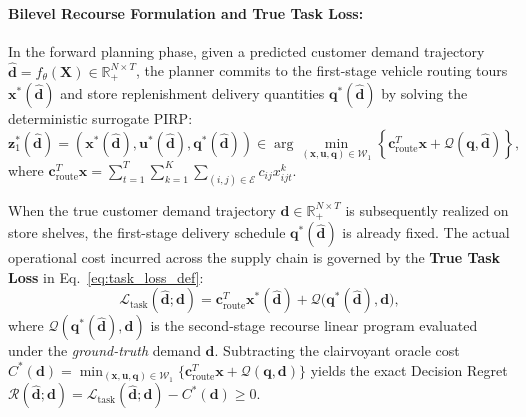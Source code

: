 \documentclass[11pt,a4paper]{article}
\theoremstyle{definition}
\theoremstyle{remark}
\begin{document}
\paragraph{Bilevel Recourse Formulation and True Task Loss:}
In the forward planning phase, given a predicted customer demand trajectory $\hat{\mathbf{d}} = f_\theta(\mathbf{X}) \in \mathbb{R}_+^{N \times T}$, the planner commits to the first-stage vehicle routing tours $\mathbf{x}^*(\hat{\mathbf{d}})$ and store replenishment delivery quantities $\mathbf{q}^*(\hat{\mathbf{d}})$ by solving the deterministic surrogate PIRP:
\begin{equation}
    \mathbf{z}_1^*(\hat{\mathbf{d}}) = (\mathbf{x}^*(\hat{\mathbf{d}}), \mathbf{u}^*(\hat{\mathbf{d}}), \mathbf{q}^*(\hat{\mathbf{d}})) \in \arg\min_{(\mathbf{x}, \mathbf{u}, \mathbf{q}) \in \mathcal{W}_1} \left\{ \mathbf{c}_{\text{route}}^T \mathbf{x} + \mathcal{Q}(\mathbf{q}, \hat{\mathbf{d}}) \right\}, \label{eq:forward_surrogate_pirp}
\end{equation}
where $\mathbf{c}_{\text{route}}^T \mathbf{x} = \sum_{t=1}^T \sum_{k=1}^K \sum_{(i,j) \in \mathcal{E}} c_{ij} x_{ijt}^k$.

When the true customer demand trajectory $\mathbf{d} \in \mathbb{R}_+^{N \times T}$ is subsequently realized on store shelves, the first-stage delivery schedule $\mathbf{q}^*(\hat{\mathbf{d}})$ is already fixed. The actual operational cost incurred across the supply chain is governed by the \textbf{True Task Loss} in Eq.~\eqref{eq:task_loss_def}:
\begin{equation}
    \mathcal{L}_{\text{task}}(\hat{\mathbf{d}}; \mathbf{d}) = \mathbf{c}_{\text{route}}^T \mathbf{x}^*(\hat{\mathbf{d}}) + \mathcal{Q}\big(\mathbf{q}^*(\hat{\mathbf{d}}), \mathbf{d}\big), \label{eq:task_loss_def}
\end{equation}
where $\mathcal{Q}(\mathbf{q}^*(\hat{\mathbf{d}}), \mathbf{d})$ is the second-stage recourse linear program evaluated under the \textit{ground-truth} demand $\mathbf{d}$. Subtracting the clairvoyant oracle cost $C^*(\mathbf{d}) = \min_{(\mathbf{x}, \mathbf{u}, \mathbf{q}) \in \mathcal{W}_1} \{ \mathbf{c}_{\text{route}}^T \mathbf{x} + \mathcal{Q}(\mathbf{q}, \mathbf{d}) \}$ yields the exact Decision Regret $\mathcal{R}(\hat{\mathbf{d}}; \mathbf{d}) = \mathcal{L}_{\text{task}}(\hat{\mathbf{d}}; \mathbf{d}) - C^*(\mathbf{d}) \ge 0$.
\end{document}
